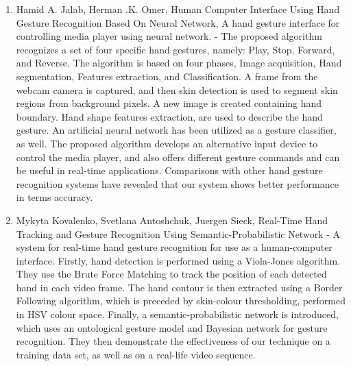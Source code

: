 \documentclass[11pt]{report}
\begin{document}
\begin{enumerate}
    \item Hamid A. Jalab, Herman .K. Omer, Human Computer Interface Using Hand Gesture Recognition Based On Neural Network, A hand gesture interface for controlling media player using neural network. \cite{8} - The proposed algorithm recognizes a set of four specific hand gestures, namely: Play, Stop, Forward, and Reverse. The algorithm is based on four phases, Image acquisition, Hand segmentation, Features extraction, and Classification. A frame from the webcam camera is captured, and then skin detection is used to segment skin regions from background pixels. A new image is created containing hand boundary. Hand shape features extraction, are used to describe the hand gesture. An artificial neural network has been utilized as a gesture classifier, as well. The proposed algorithm develops an alternative input device to control the media player, and also offers different gesture commands and can be useful in real-time applications. Comparisons with other hand gesture recognition systems have revealed that our system shows better performance in terms accuracy.
    
    \item Mykyta Kovalenko, Svetlana Antoshchuk, Juergen Sieck, Real-Time Hand Tracking and Gesture Recognition Using Semantic-Probabilistic Network \cite{9} - A system for real-time hand gesture  recognition  for use  as  a  human-computer  interface.  Firstly,   hand   detection   is   performed   using   a   Viola-Jones   algorithm.  They  use  the  Brute Force Matching  to  track  the  position  of  each  detected  hand  in  each  video  frame.  The  hand  contour  is  then  extracted  using  a  Border  Following  algorithm,  which  is  preceded  by  skin-colour   thresholding, performed   in   HSV   colour   space.   Finally,  a  semantic-probabilistic  network  is  introduced,  which  uses  an  ontological  gesture  model  and  Bayesian  network  for  gesture  recognition.  They  then  demonstrate  the  effectiveness  of  our  technique  on  a  training  data  set,  as  well  as  on a  real-life video sequence.
    

\end{enumerate}
\end{document}
